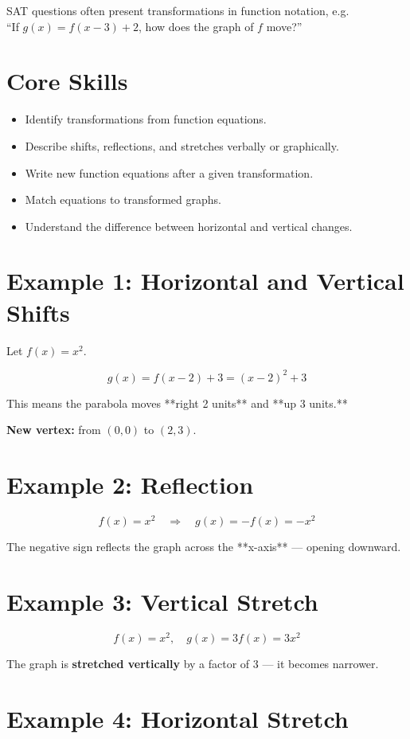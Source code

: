 \documentclass[14pt]{extarticle}
\begin{document}
SAT questions often present transformations in function notation, e.g. \\
“If \(g(x) = f(x - 3) + 2\), how does the graph of \(f\) move?”

\section*{Core Skills}
\begin{itemize}
  \item Identify transformations from function equations.
  \item Describe shifts, reflections, and stretches verbally or graphically.
  \item Write new function equations after a given transformation.
  \item Match equations to transformed graphs.
  \item Understand the difference between horizontal and vertical changes.
\end{itemize}

\section*{Example 1: Horizontal and Vertical Shifts}

Let \(f(x) = x^2.\)

\[
g(x) = f(x - 2) + 3 = (x - 2)^2 + 3
\]

This means the parabola moves **right 2 units** and **up 3 units.**

\textbf{New vertex:} from \((0,0)\) to \((2,3)\).

\section*{Example 2: Reflection}

\[
f(x) = x^2 \quad \Rightarrow \quad g(x) = -f(x) = -x^2
\]

The negative sign reflects the graph across the **x-axis** — opening downward.

\section*{Example 3: Vertical Stretch}

\[
f(x) = x^2, \quad g(x) = 3f(x) = 3x^2
\]

The graph is \textbf{stretched vertically} by a factor of 3 — it becomes narrower.

\section*{Example 4: Horizontal Stretch}
\end{document}
